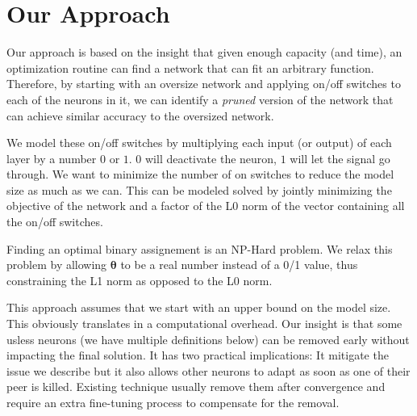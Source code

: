 \section{Our Approach}


Our approach is based on the insight that given enough capacity (and time), an 
optimization routine can find a network that can fit an arbitrary function.
Therefore, by starting with an oversize network and applying on/off switches to
each of the neurons in it, we can identify a {\it pruned} version of the network
that can achieve similar accuracy to the oversized network.


We model these on/off switches by multiplying each input
(or output) of each layer by a number $0$ or $1$. 
$0$ will deactivate the
neuron, $1$ will let the signal go through. 
We want to minimize the number of on
switches to reduce the model size as much as we can. 
This can be modeled solved
by jointly minimizing the objective of the network and a factor of the L0 norm
of the vector containing all the on/off switches.

Finding an optimal binary assignement is an NP-Hard problem. 
We relax this problem
by allowing $\bm{\theta}$ to be a real number instead of a 0/1 value, thus
constraining the L1 norm as opposed to the L0 norm.

This approach assumes that we start with an upper bound on the model size. This
obviously translates in a computational overhead. Our insight is that some
usless neurons (we have multiple definitions below) can be removed early without
impacting the final solution. It has two practical implications: It mitigate the
issue we describe but it also allows other neurons to adapt as soon as one of
their peer is killed. Existing technique usually remove them after convergence
and require an extra fine-tuning process to compensate for the removal.

